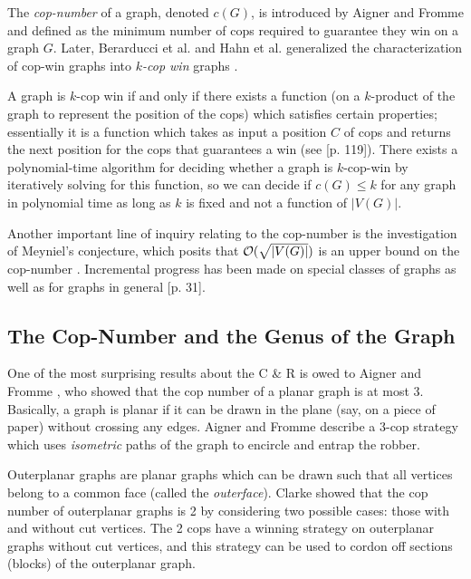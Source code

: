 The \textit{cop-number} of a graph, denoted $c(G)$, is introduced by Aigner and Fromme  \cite{aigner1984game} and defined as the minimum number of cops required
to guarantee they win on a graph $G$. Later, Berarducci et al. and Hahn et al.  generalized the characterization of cop-win graphs
into \textit{$k$-cop win} graphs \cite{berarducci1993cop, hahn2003characterisation}.

A graph is $k$-cop win if and only if there exists a function (on a $k$-product of the graph to represent the position of the cops)
which satisfies certain properties; essentially it is a function which takes as input a position $C$ of cops and returns the next position for the cops that guarantees a win (see \cite{bonato2011game}[p. 119]).
There exists a polynomial-time algorithm for deciding whether a graph is $k$-cop-win by iteratively
solving for this function, so we can decide if $c(G) \leq k$ for any graph in polynomial time as long as $k$ is fixed and not a function of $\lvert V(G) \rvert$.

Another important line of inquiry relating to the cop-number is the investigation of Meyniel's conjecture, which posits that $\mathcal{O}(\sqrt{\lvert V(G)\rvert })$ is an upper bound on the cop-number \cite{frankl1987cops}.
Incremental progress has been made on special classes of graphs as well as for graphs in general  \cite{gera2016graph}[p. 31].

\subsection{The Cop-Number and the Genus of the Graph}

One of the most surprising results about the C \& R is owed to Aigner and Fromme \cite{aigner1984game}, who showed that the cop number of a planar graph is at most 3.
Basically, a graph is planar if it can be drawn in the plane (say, on a piece of paper) without crossing any edges. Aigner and Fromme describe a 3-cop strategy which uses \textit{isometric} paths of the graph to encircle and entrap the robber.

Outerplanar graphs are planar graphs which can be drawn such that all vertices belong to a common face
(called the \textit{outerface}). Clarke \cite{clarke2002constrained} showed that the cop number of outerplanar graphs is 2 by considering
two possible cases: those with and without cut vertices. The 2 cops have a winning strategy on outerplanar graphs without cut vertices, and this strategy can be used to cordon off sections (blocks)
of the outerplanar graph.

